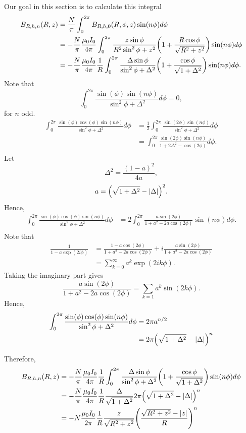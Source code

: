 \documentclass{article}
\begin{document}
Our goal in this section is to calculate this integral
\[\begin{aligned}
B_{R, h, n}(R, z) &= \frac{N}{\pi}\int_0^{2\pi} B_{R, h, 0}(R, \phi, z)\sin(n\phi)d\phi \\
&= -\frac{N}{\pi}\frac{\mu_0 I_0}{4 \pi}\int_0^{2\pi} \frac{z\sin\phi}{R^2\sin^2\phi+z^2}\qty(1+\frac{R\cos\phi}{\sqrt{R^2+z^2}})\sin(n\phi)d\phi \\
&= -\frac{N}{\pi}\frac{\mu_0 I_0}{4 \pi}\frac{1}{R}\int_0^{2\pi} \frac{\Delta\sin\phi}{\sin^2\phi+\Delta^2}\qty(1+\frac{\cos\phi}{\sqrt{1+\Delta^2}})\sin(n\phi)d\phi.
\end{aligned}\]
Note that
\[\int_{0}^{2\pi}\frac{\sin(\phi)\sin(n\phi)}{\sin^2\phi+\Delta^2}d\phi = 0,\]
for $n$ odd.
\[\begin{aligned}
\int_{0}^{2\pi}\frac{\sin(\phi)\cos(\phi)\sin(n\phi)}{\sin^2\phi+\Delta^2}d\phi &= \frac{1}{2}\int_{0}^{2\pi}\frac{\sin(2\phi)\sin(n\phi)}{\sin^2\phi+\Delta^2}d\phi \\
&=\int_{0}^{2\pi}\frac{\sin(2\phi)\sin(n\phi)}{1+2\Delta^2-\cos(2\phi)}d\phi. \\
\end{aligned}\]
Let
\[\Delta^2 = \frac{(1-a)^2}{4a},\]
\[a = \qty(\sqrt{1+\Delta^2}-\abs{\Delta})^2.\]
Hence,
\[\begin{aligned}
\int_{0}^{2\pi}\frac{\sin(\phi)\cos(\phi)\sin(n\phi)}{\sin^2\phi+\Delta^2}d\phi &= 2\int_{0}^{2\pi}\frac{a\sin(2\phi)}{1+a^2-2a\cos(2\phi)}\sin(n\phi)d\phi. \\
\end{aligned}\]
Note that
\[\begin{aligned}
\frac{1}{1-a\exp(2i\phi)} &= \frac{1-a\cos(2\phi)}{1+a^2-2a\cos(2\phi)}+i\frac{a\sin(2\phi)}{1+a^2-2a\cos(2\phi)} \\
&= \sum_{k=0}^{\infty}a^k\exp(2ik\phi).
\end{aligned}\]
Taking the imaginary part gives
\[\frac{a\sin(2\phi)}{1+a^2-2a\cos(2\phi)}=\sum_{k=1}a^k\sin(2k\phi).\]
Hence,
\[\begin{aligned}
\int_{0}^{2\pi}\frac{\sin(\phi)\cos(\phi)\sin(n\phi)}{\sin^2\phi+\Delta^2}d\phi &= 2\pi a^{n/2} \\
&= 2\pi\qty(\sqrt{1+\Delta^2}-\abs{\Delta})^n
\end{aligned}\]

Therefore,
\[\begin{aligned}
B_{R, h, n}(R, z) &= -\frac{N}{\pi}\frac{\mu_0 I_0}{4 \pi}\frac{1}{R}\int_0^{2\pi} \frac{\Delta\sin\phi}{\sin^2\phi+\Delta^2}\qty(1+\frac{\cos\phi}{\sqrt{1+\Delta^2}})\sin(n\phi)d\phi \\
&= -\frac{N}{\pi}\frac{\mu_0 I_0}{4 \pi}\frac{1}{R}\frac{\Delta}{\sqrt{1+\Delta^2}}2\pi\qty(\sqrt{1+\Delta^2}-\abs{\Delta})^n \\
&= -N\frac{\mu_0 I_0}{2 \pi}\frac{1}{R}\frac{z}{\sqrt{R^2+z^2}}\qty(\frac{\sqrt{R^2+z^2}-\abs{z}}{R})^n \\
\end{aligned}\]
\end{document}
